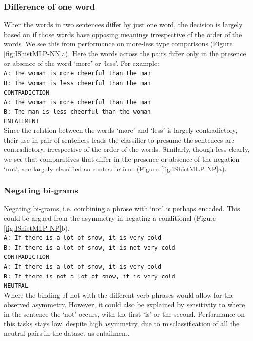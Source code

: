 \documentclass[10pt,letterpaper]{article}
\begin{document}
\subsubsection{Difference of one word}
When the words in two sentences differ by just one word, the decision is largely based on if those words have opposing meanings irrespective of the order of the words. We see this from performance on more-less type comparisons (Figure \ref{fig:IShistMLP-NN}a). Here the words across the pairs differ only in the presence or absence of the word `more' or `less'. For example:\\
{\tt A: The woman is more cheerful than the man \\ B: The woman is less cheerful than the man\\ CONTRADICTION \\}{\tt A: The woman is more cheerful than the man \\ B: The man is less cheerful than the woman \\ ENTAILMENT} \\
Since the relation between the words `more' and `less' is largely contradictory, their use in pair of sentences leads the classifier to presume the sentences are contradictory, irrespective of the order of the words. Similarly, though less clearly, we see that comparatives that differ in the presence  or absence of the negation `not', are largely classified as contradictions (Figure \ref{fig:IShistMLP-NP}a).


\subsubsection{Negating bi-grams}
Negating bi-grams, i.e. combining a phrase with `not' is perhaps encoded. This could be argued from the asymmetry in negating a conditional (Figure \ref{fig:IShistMLP-NP}b).
\\
{\tt A: If there is a lot of snow, it is very cold \\ B: If there is a lot of snow, it is not very cold \\ CONTRADICTION \\}{\tt A: If there is a lot of snow, it is very cold \\ B: If there is not a lot of snow, it is very cold \\ NEUTRAL}\\
Where the binding of not with the different verb-phrases would allow for the observed asymmetry. However, it could also be explained by sensitivity to where in the sentence the `not' occurs, with the first `is' or the second. Performance on this tasks stays low. despite high asymmetry, due to misclassification of all the neutral pairs in the dataset as entailment.
\end{document}
